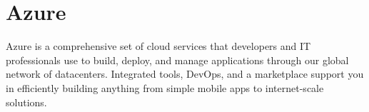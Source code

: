 \section{Azure}
Azure is a comprehensive set of cloud services that developers and IT
professionals use to build, deploy, and manage applications through our global
network of datacenters. Integrated tools, DevOps, and a marketplace support
you in efficiently building anything from simple mobile apps to internet-scale
solutions.\cite{www-azure}

